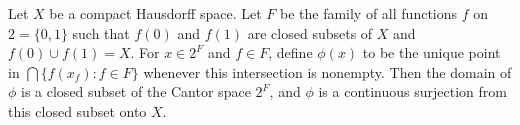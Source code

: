 Let $X$ be a compact Hausdorff space. Let $F$ be the family of all functions $f$ on $2 = \{0,1\}$ such that $f(0)$ and $f(1)$ are closed subsets of $X$ and $f(0) \cup f(1) = X$. For $x \in 2^F$ and $f \in F$, define $\phi(x)$ to be the unique point in $\bigcap \{f(x_f) : f \in F\}$ whenever this intersection is nonempty. Then the domain of $\phi$ is a closed subset of the Cantor space $2^F$, and $\phi$ is a continuous surjection from this closed subset onto $X$.
